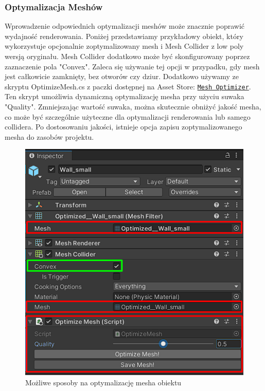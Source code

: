 \subsubsection{Optymalizacja Meshów}
Wprowadzenie odpowiednich optymalizacji meshów może znacznie poprawić wydajność renderowania. Poniżej przedstawiamy przykładowy obiekt, który wykorzystuje opcjonalnie zoptymalizowany mesh i Mesh Collider z low poly wersją oryginału. Mesh Collider dodatkowo może być skonfigurowany poprzez zaznaczenie pola "Convex". Zaleca się używanie tej opcji w przypadku, gdy mesh jest całkowicie zamknięty, bez otworów czy dziur. Dodatkowo używamy ze skryptu OptimizeMesh.cs z paczki dostępnej na Asset Store: \href{https://assetstore.unity.com/packages/tools/modeling/mesh-optimizer-154517}{\texttt{Mesh Optimizer}}. Ten skrypt umożliwia dynamiczną optymalizację mesha przy użyciu suwaka "Quality". Zmniejszając wartość suwaka, można skutecznie obniżyć jakość mesha, co może być szczególnie użyteczne dla optymalizacji renderowania lub samego collidera. Po dostosowaniu jakości, istnieje opcja zapisu zoptymalizowanego mesha do zasobów projektu.
\begin{figure}[h]
    \centering
    \includegraphics[scale=0.7]{Images/meshOptimization.png}
    \caption{Możliwe sposoby na optymalizację mesha obiektu}
\end{figure}


